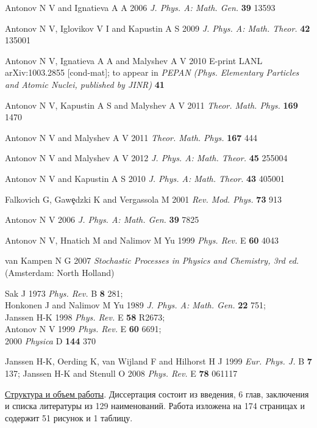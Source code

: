 \documentclass []{rusthesis} %
\begin{document}
\begin{thebibliography}{99}
 Antonov N V and Ignatieva A A 2006
{\it J. Phys. A: Math. Gen.} {\bf 39} 13593

 Antonov N V, Iglovikov V I and Kapustin A S 2009
{\it J. Phys. A: Math. Theor.} {\bf 42} 135001

 Antonov N V, Ignatieva A A and Malyshev A V 2010
E-print LANL arXiv:1003.2855 [cond-mat]; to appear in {\it PEPAN
(Phys. Elementary Particles and Atomic Nuclei, published by JINR)} {\bf 41}

Antonov N V, Kapustin A S and Malyshev A V 2011 
{\it Theor. Math. Phys.} 
{\bf 169} 1470


Antonov N V and Malyshev A V 2011 
{\it Theor. Math. Phys.}
{\bf 167} 444

Antonov N V and Malyshev A V 2012 
{\it J. Phys. A: Math. Theor.} 
{\bf 45} 255004


Antonov N V and Kapustin A S 2010 
{\it J. Phys. A: Math. Theor.}
{\bf 43} 405001


 Falkovich G, Gaw\c{e}dzki K and Vergassola M  2001
{\it Rev. Mod. Phys.} {\bf 73} 913

 Antonov N V 2006 {\it J. Phys. A: Math. Gen.} {\bf 39} 7825

 Antonov N V, Hnatich M and Nalimov M Yu 1999
{\it Phys. Rev.} E {\bf 60} 4043

 van Kampen N G 2007 {\it Stochastic Processes in Physics
and Chemistry, 3rd ed.} (Amsterdam: North Holland)

 Sak J 1973 {\it Phys. Rev.} B {\bf 8} 281;\\
Honkonen J and Nalimov M Yu 1989 {\it J. Phys. A: Math. Gen.} {\bf 22} 751;\\
Janssen H-K 1998 {\it Phys. Rev.} E {\bf 58} R2673;\\
Antonov N V 1999 {\it Phys. Rev.} E {\bf 60} 6691;\\
2000 {\it Physica} D {\bf 144} 370

 Janssen H-K, Oerding K, van Wijland F and Hilhorst H J
1999 {\it Eur. Phys. J.} B {\bf 7} 137; Janssen H-K and Stenull O 2008
{\it Phys. Rev.} E {\bf 78} 061117

\end{thebibliography}
\underline{Структура и объем работы}. Диссертация состоит из введения, 6 глав, заключения и списка литературы из 129 наименований. Работа изложена на 174 страницах и содержит 51 рисунок и 1 таблицу.
\end{document}
